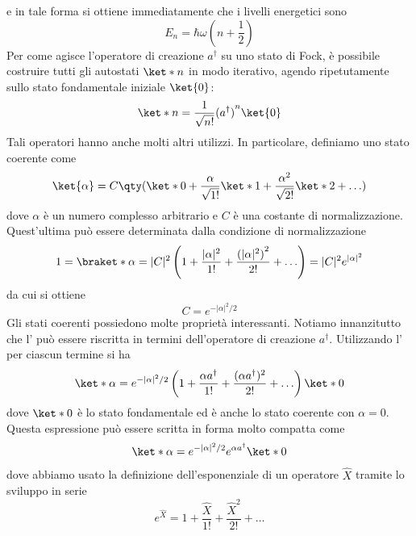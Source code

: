 e in tale forma si ottiene immediatamente che i livelli energetici sono
\begin{equation*}
   E_n = \hbar \omega \left( n + \frac{1}{2} \right)
\end{equation*}
Per come agisce l'operatore di creazione $a^{\dag}$ su uno stato di Fock, è possibile costruire tutti gli autostati $\ket*{n}$ in modo iterativo, agendo ripetutamente sullo stato fondamentale iniziale $\ket{0}$:
\begin{equation}
   \ket*{n}=\frac{1}{\sqrt{n!}} {(a^{\dag})}^n \ket{0}
   \label{eq:formula_ricorsiva_autostati_oscillatore}
\end{equation}
Tali operatori hanno anche molti altri utilizzi. In particolare, definiamo uno stato coerente come
\begin{equation}
   \ket{\alpha} 
   = C \qty(
   \ket*{0}
   + \frac{\alpha}{\sqrt{1!}} \ket*{1}
   + \frac{\alpha^2}{\sqrt{2!}} \ket*{2}
   + \ldots )
   \label{eq:coherent_state}
\end{equation}
dove $\alpha$ è un numero complesso arbitrario e $C$ è una costante di normalizzazione. Quest'ultima può essere determinata dalla condizione di normalizzazione
\begin{equation*}
   1 = \braket*{\alpha}
   = |C|^2 \left( 1 + \frac{|\alpha|^2}{1!} + \frac{{(|\alpha|^2)}^2}{2!} + \ldots \right)
   = |C|^2 e^{|\alpha|^2}
\end{equation*}
da cui si ottiene
\begin{equation*}
   C = e^{-|\alpha|^2/2}
\end{equation*}
Gli stati coerenti possiedono molte proprietà interessanti. Notiamo innanzitutto che l' può essere riscritta in termini dell'operatore di creazione $a^{\dag}$. Utilizzando l' per ciascun termine si ha
\begin{equation*}
   \ket*{\alpha}
   = e^{-|\alpha|^2/2} \left( 1 + \frac{\alpha a^{\dag}}{1!} + \frac{(\alpha a^{\dag})^2}{2!} + \ldots \right) \ket*{0}
\end{equation*}
dove $\ket*{0}$ è lo stato fondamentale ed è anche lo stato coerente con $\alpha = 0$. Questa espressione può essere scritta in forma molto compatta come
\begin{equation*}
\ket*{\alpha} = e^{-|\alpha|^2/2} e^{\alpha a^{\dag}} \ket*{0}
\end{equation*}
dove abbiamo usato la definizione dell'esponenziale di un operatore $\hat{X}$ tramite lo sviluppo in serie
\begin{equation*}
   e^{\hat{X}} = 1 + \frac{\hat{X}}{1!} + \frac{\hat{X}^2}{2!} + \ldots
\end{equation*}
